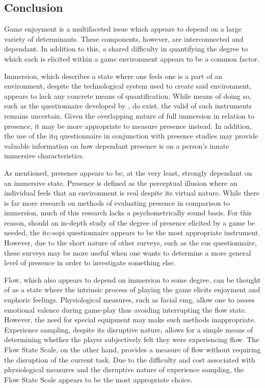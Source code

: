 \subsection{Conclusion}
Game enjoyment is a multifaceted issue which appears to depend on a large variety of determinants. These components, however, are interconnected and dependant. In addition to this, a shared difficulty in quantifying the degree to which each is elicited within a game environment appears to be a common factor.

Immersion, which describes a state where one feels one is a part of an environment, despite the technological system used to create said environment, appears to lack any concrete means of quantification. While means of doing so, such as the questionnaire developed by \citet{Ermi05}, do exist, the \gls{valid} of such instruments remains uncertain. Given the overlapping nature of full immersion in relation to presence, it may be more appropriate to measure presence instead. In addition, the use of the \gls{itq} questionnaire in conjunction with presence studies may provide valuable information on how dependant presence is on a person's innate immersive characteristics.

As mentioned, presence appears to be, at the very least, strongly dependant on an immersive state. Presence is defined as the perceptual illusion where an individual feels that an environment is real despite its virtual nature. While there is far more research on methods of evaluating presence in comparison to immersion, much of this research lacks a psychometrically sound basis. For this reason, should an in-depth study of the degree of presence elicited by a game be needed, the \gls{itc-sopi} questionnaire appears to be the most appropriate instrument. However, due to the short nature of other surveys, such as the \gls{sus} questionnaire, these surveys may be more useful when one wants to determine a more general level of presence in order to investigate something else.

Flow, which also appears to depend on immersion to some degree, can be thought of as a state where the intrinsic process of playing the game elicits enjoyment and euphoric feelings. Physiological measures, such as facial \gls{emg}, allow one to assess emotional valence during game-play thus avoiding interrupting the flow state. However, the need for special equipment may make such methods inappropriate. Experience sampling, despite its disruptive nature, allows for a simple means of determining whether the player subjectively felt they were experiencing flow. The Flow State Scale, on the other hand, provides a measure of flow without requiring the disruption of the current task. Due to the difficulty and cost associated with physiological measures and the disruptive nature of experience sampling, the Flow State Scale appears to be the most appropriate choice.

